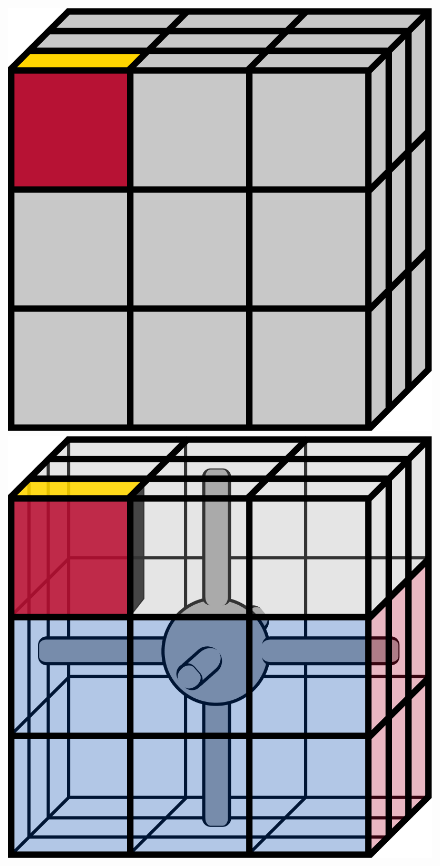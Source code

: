 \documentclass[12pt]{article}
\begin{document}
\begin{figure}[h]
\begin{minipage}[c]{0.2\textwidth}
    \end{minipage}
    \begin{minipage}[c]{0.05\textwidth}
        \centering
    \end{minipage}
    \hspace{0.5cm}
    \begin{minipage}[c]{0.2\textwidth}
        \includegraphics[scale=0.1]{cubies/cubies_3.png}
    \end{minipage}
    \begin{minipage}[c]{0.2\textwidth}
        \includegraphics[scale=0.1]{cubies/cubies_4.png}

\end{minipage}
\end{figure}
\end{document}
